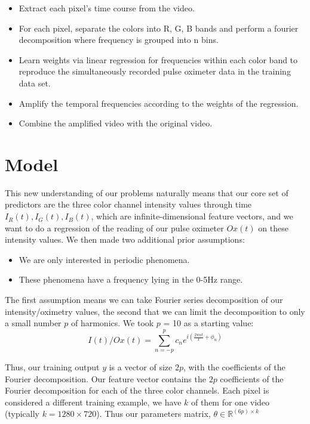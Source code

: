 \documentclass[12pt]{article}
\begin{document}
\begin{itemize}
\item Extract each pixel’s time course from the video. 
\item For each pixel, separate the colors into R, G, B bands and perform a fourier decomposition where frequency is grouped into n bins.
\item Learn weights via linear regression for frequencies within each color band to reproduce the simultaneously recorded pulse oximeter data in the training data set. 
\item Amplify the temporal frequencies according to the weights of the regression.
\item Combine the amplified video with the original video.
\end{itemize}


  


\section{Model}
  This new understanding of our problems naturally means that our core set of predictors are the three color channel intensity values through
  time \(I_R(t), I_G(t), I_B(t)\), which are infinite-dimensional feature vectors, and we want to do a regression of the reading of our pulse oximeter $Ox(t)$ 
  on these intensity values.
  We then made two additional prior assumptions:
  \begin{itemize}
    \item We are only interested in periodic phenomena.
    \item These phenomena have a frequency lying in the 0-5Hz range.
  \end{itemize}

  The first assumption means we can take Fourier series decomposition of our intensity/oximetry values, the second that we can
  limit the decomposition to only a small number $p$ of harmonics. We took $p$ = 10 as a starting value:
  \[
    I(t)/Ox(t) = \sum_{n=-p}^{p} c_n e^{i \left(\frac{2\pi nt}{T}  + \phi_n \right) }
  \]

  Thus, our training output $y$ is a vector of size $2p$, with the coefficients of the Fourier decomposition.
  Our feature vector contains the $2p$ coefficients of the Fourier decomposition for each of the three color channels.
  Each pixel is considered a different training example, we have $k$ of them for one video (typically \(k=1280\times 720\)).
  Thus our parameters matrix, $\theta \in \mathbb{R}^{(6p) \times k}$
\end{document}
